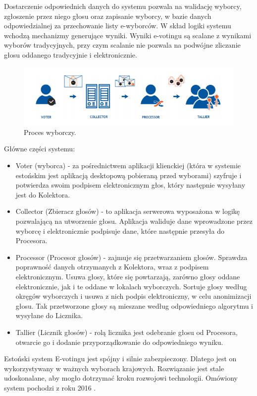 \documentclass[a4paper,12pt]{book}
\begin{document}
Dostarczenie odpowiednich danych do systemu pozwala na walidację wyborcy, zgłoszenie przez
niego głosu oraz zapisanie wyborcy, w bazie danych odpowiedzialnej za przechowanie listy e-wyborców. W skład logiki systemu wchodzą mechanizmy generujące wyniki. Wyniki e-votingu są scalane z wynikami wyborów tradycyjnych, przy czym scalanie nie pozwala na podwójne zliczanie głosu oddanego tradycyjnie i elektronicznie.

\begin{figure}[h]
	\centering
	\includegraphics[width=\textwidth]{images/Główne częsci systemu estońskiego.png}
	\caption{Proces wyborczy. \cite{estonian:voting}}
\end {figure}

Główne części systemu:
\begin{itemize}
\item Voter (wyborca) - za pośrednictwem aplikacji klienckiej (która w systemie estońskim jest aplikacją desktopową pobieraną przed wyborami) szyfruje i potwierdza swoim podpisem elektronicznym głos, który następnie wysyłany jest do Kolektora.
\item Collector (Zbieracz głosów) - to aplikacja serwerowa wyposażona w logikę pozwalającą na utworzenie głosu. Aplikacja waliduje dane wprowadzone przez wyborcę i elektronicznie podpisuje dane, które następnie przesyła do Procesora.
\item Processor (Procesor głosów) - zajmuje się przetwarzaniem głosów. Sprawdza poprawność danych otrzymanych z Kolektora, wraz z podpisem elektronicznym. Usuwa głosy, które się powtarzają, zarówno głosy oddane elektronicznie, jak i te oddane w lokalach wyborczych. Sortuje głosy według okręgów wyborczych i usuwa z nich podpis elektroniczny, w celu anonimizacji głosu. Tak przetworzone głosy są mieszane według odpowiedniego algorytmu i wysyłane do Licznika.
\item Tallier (Licznik głosów) - rolą licznika jest odebranie głosu od Procesora, otwarcie go i dodanie przyporządkowanie do odpowiedniego wyniku.
\end{itemize}

Estoński system E-votingu jest spójny i silnie zabezpieczony. Dlatego jest on wykorzystywany w ważnych wyborach krajowych. Rozwiązanie jest stale udoskonalane, aby mogło dotrzymać kroku rozwojowi technologii. Omówiony system pochodzi z roku 2016 \cite{estonian:voting}.
\end{document}
